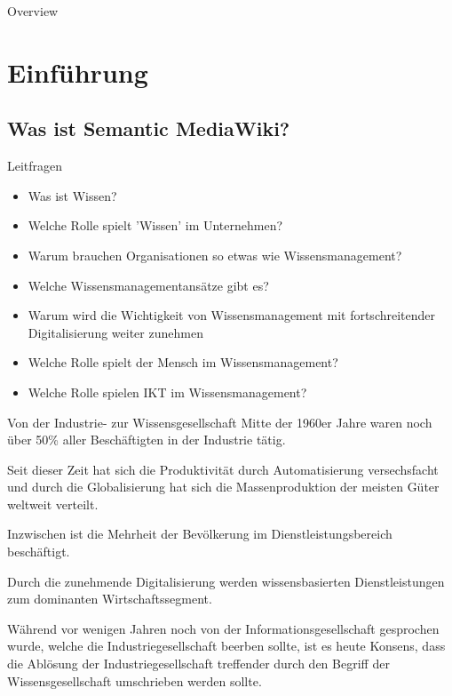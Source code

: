\documentclass[aspectratio=1610,onlymath]{beamer}
\begin{document}
\maketitle


\begin{frame}{Overview}
\tableofcontents
\end{frame}



%
%

\section{Einführung}
\subsection{Was ist Semantic MediaWiki? } %
\label{sub:was_ist_semantic_mediawiki}


\begin{frame}{Leitfragen}
\begin{itemize}
	\item Was ist Wissen?
	\item Welche Rolle spielt 'Wissen' im Unternehmen?
	\item Warum brauchen Organisationen so etwas wie Wissensmanagement?
	\item Welche Wissensmanagementansätze gibt es?
	\item Warum wird die Wichtigkeit von Wissensmanagement mit fortschreitender Digitalisierung weiter zunehmen
	\item Welche Rolle spielt der Mensch im Wissensmanagement?
	\item Welche Rolle spielen IKT im Wissensmanagement?
\end{itemize}
\end{frame}


\begin{frame}{Von der Industrie- zur Wissensgesellschaft}
Mitte der 1960er Jahre waren noch über 50\% aller Beschäftigten in der Industrie tätig.

Seit dieser Zeit hat sich die Produktivität durch Automatisierung versechsfacht und durch die Globalisierung hat sich die Massenproduktion der meisten Güter weltweit verteilt.

Inzwischen ist die Mehrheit der Bevölkerung im Dienstleistungsbereich beschäftigt.

Durch die zunehmende Digitalisierung werden wissensbasierten Dienstleistungen zum dominanten Wirtschaftssegment.

Während vor wenigen Jahren noch von der Informationsgesellschaft gesprochen wurde, welche die Industriegesellschaft beerben sollte, ist es heute Konsens, dass die Ablösung der Industriegesellschaft treffender durch den Begriff der \alert{Wissensgesellschaft} umschrieben werden sollte.

\end{frame}
\end{document}

